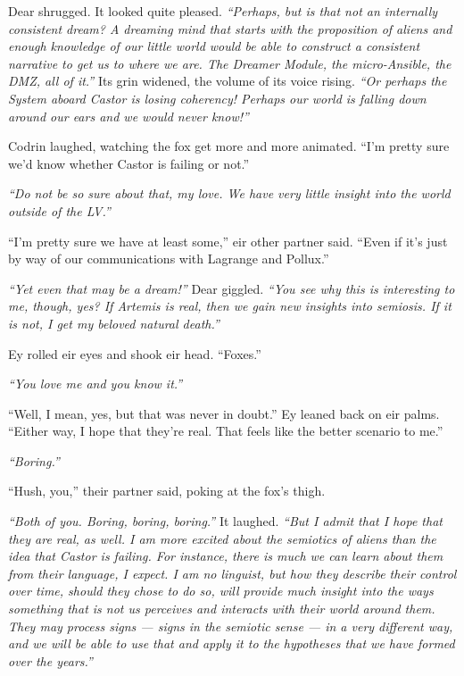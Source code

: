 Dear shrugged. It looked quite pleased. \emph{``Perhaps, but is that not an internally consistent dream? A dreaming mind that starts with the proposition of aliens and enough knowledge of our little world would be able to construct a consistent narrative to get us to where we are. The Dreamer Module, the micro-Ansible, the DMZ, all of it.''} Its grin widened, the volume of its voice rising. \emph{``Or perhaps the System aboard Castor is losing coherency! Perhaps our world is falling down around our ears and we would never know!''}

Codrin laughed, watching the fox get more and more animated. ``I'm pretty sure we'd know whether Castor is failing or not.''

\emph{``Do not be so sure about that, my love. We have very little insight into the world outside of the LV.''}

``I'm pretty sure we have at least some,'' eir other partner said. ``Even if it's just by way of our communications with Lagrange and Pollux.''

\emph{``Yet even that may be a dream!''} Dear giggled. \emph{``You see why this is interesting to me, though, yes? If Artemis is real, then we gain new insights into semiosis. If it is not, I get my beloved natural death.''}

Ey rolled eir eyes and shook eir head. ``Foxes.''

\emph{``You love me and you know it.''}

``Well, I mean, yes, but that was never in doubt.'' Ey leaned back on eir palms. ``Either way, I hope that they're real. That feels like the better scenario to me.''

\emph{``Boring.''}

``Hush, you,'' their partner said, poking at the fox's thigh.

\emph{``Both of you. Boring, boring, boring.''} It laughed. \emph{``But I admit that I hope that they are real, as well. I am more excited about the semiotics of aliens than the idea that Castor is failing. For instance, there is much we can learn about them from their language, I expect. I am no linguist, but how they describe their control over time, should they chose to do so, will provide much insight into the ways something that is not us perceives and interacts with their world around them. They may process signs --- signs in the semiotic sense --- in a very different way, and we will be able to use that and apply it to the hypotheses that we have formed over the years.''}


